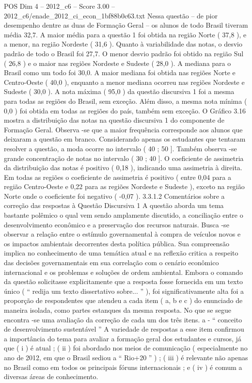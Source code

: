\begin{textsample}{POS Dim 4 – 2012\_c6 – Score 3.00 – 2012\_c6/enade\_2012\_ci\_econ\_1bf88b0c63.txt}
Nessa questão – de pior desempenho dentre as duas de Formação Geral – os alunos de todo Brasil tiveram média 32,7.
A maior média para a questão 1 foi obtida na região Norte ( 37,8 ), e a menor, na região Nordeste ( 31,6 ).
Quanto à variabilidade das notas, o desvio padrão de todo o Brasil foi 27,7.
O menor desvio padrão foi obtido na região Sul ( 26,8 ) e o maior nas regiões Nordeste e Sudeste ( 28,0 ).
A mediana para o Brasil como um todo foi 30,0.
A maior mediana foi obtida nas regiões Norte e Centro-Oeste ( 40,0 ), enquanto a menor mediana ocorreu nas regiões Nordeste e Sudeste ( 30,0 ).
A nota máxima ( 95,0 ) da questão discursiva 1 foi a mesma para todas as regiões do Brasil, sem exceção.
Além disso, a mesma nota mínima ( 0,0 ) foi obtida em todas as regiões do país, também sem exceção.
O Gráfico 3.16 mostra a distribuição das notas na questão discursiva 1 do componente de Formação Geral.
Observa -se que a maior frequência corresponde aos alunos que deixaram a questão em branco.
Considerando apenas os estudantes que tentaram resolver a questão, a moda ocorre no intervalo ( 40 ; 50 ].
Também observa -se grande concentração de notas no intervalo ( 30 ; 40 ].
O coeficiente de assimetria da distribuição das notas é positivo ( 0,18 ), indicando uma assimetria à direita.
Em todas as regiões o coeficiente de assimetria é positivo ( entre 0,04 para a região Centro-Oeste e 0,22 para as regiões Nordeste e Sudeste ), exceto na região Norte onde o coeficiente foi negativo ( -0,07 ). 3.3.1.2 Comentários sobre a correção das respostas à Questão Discursiva 1 A questão aborda um tema bastante polêmico o qual vem sendo amplamente discutido, a conciliação entre o desenvolvimento econômico e a preservação dos recursos naturais.
Busca -se observar a relação entre o estímulo governamental à compra de veículos novos e os impactos ambientais decorrentes desta política pública.
Sua compreensão implica no conhecimento de uma temática atual e na reflexão critica a respeito das decisões governamentais em sua correlação com o cenário econômico internacional e os problemas e soluções de ordem ambiental.
Embora o comando da questão solicitasse explicitamente que a resposta fosse fornecida em um texto único ( “ redija um texto dissertativo sobre... ” ), foi significativamente alta foi a proporção de respondentes que atendeu a cada item ( a, b e c ) do enunciado de maneira isolada, como partes estanques da mesma resposta.
No que se segue encontra -se uma avaliação da correção de cada um dos três itens. a - “ conceito de desenvolvimento sustentável ” A variedade de respostas a esse item confirmou a importância do tema para avaliar a formação geral dos estudantes e cursos, já que ( i ) é atual ; ( ii ) foi abordado nos meios de comunicação ( especialmente no ano de 2012, em que o Brasil sediou a “ Rio+20 ” ) ; ( iii ) é relevante não apenas no Brasil como em todos os principais fóruns internacionais ; e ( iv ) é comum a diversas áreas de conhecimento.

\end{textsample}
